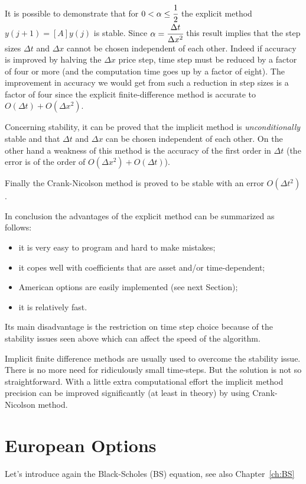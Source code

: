 It is possible to demonstrate that for $0< \alpha\leq\cfrac{1}{2}$ the explicit method $y(j+1) = [A]y(j)$ is stable.
Since $\alpha=\cfrac{\Delta t}{\Delta x^2}$ this result implies that the step sizes $\Delta t$ and $\Delta x$  cannot be chosen independent of each other.
Indeed if accuracy is improved by halving the $\Delta x$ price step, time step must be reduced by a factor of four or more (and the computation time goes up by a factor of eight). The improvement in accuracy we would get from such a reduction in step sizes is a factor of four since the explicit finite-difference method is accurate to $O(\Delta t) + O(\Delta x^2)$.

Concerning stability, it can be proved that the implicit method is \emph{unconditionally} stable and that $\Delta t$ and $\Delta x$ can be chosen independent of each other.
On the other hand a weakness of this method is the accuracy of the first order in $\Delta t$ (the error is of the order of $O(\Delta x^2) + O(\Delta t)$). 

Finally the Crank-Nicolson method is proved to be stable with an error $O(\Delta t^2)$. 

In conclusion the advantages of the explicit method can be summarized as follows:
\begin{itemize}
\tightlist
\item it is very easy to program and hard to make mistakes;
\item it copes well with coefficients that are asset and/or time-dependent;
\item American options are easily implemented (see next Section);
\item it is relatively fast.
\end{itemize}

Its main disadvantage is the restriction on time step choice because of the stability issues seen above which can affect the speed of the algorithm.

Implicit finite difference methods are usually used to overcome the stability issue. There is no more need for ridiculously small time-steps. But the solution is not so straightforward. With a little extra computational effort the implicit method precision can be improved significantly (at least in theory) by using Crank-Nicolson method. 

\section{European Options}
Let's introduce again the Black-Scholes (BS) equation, see also Chapter~\ref{ch:BS}

